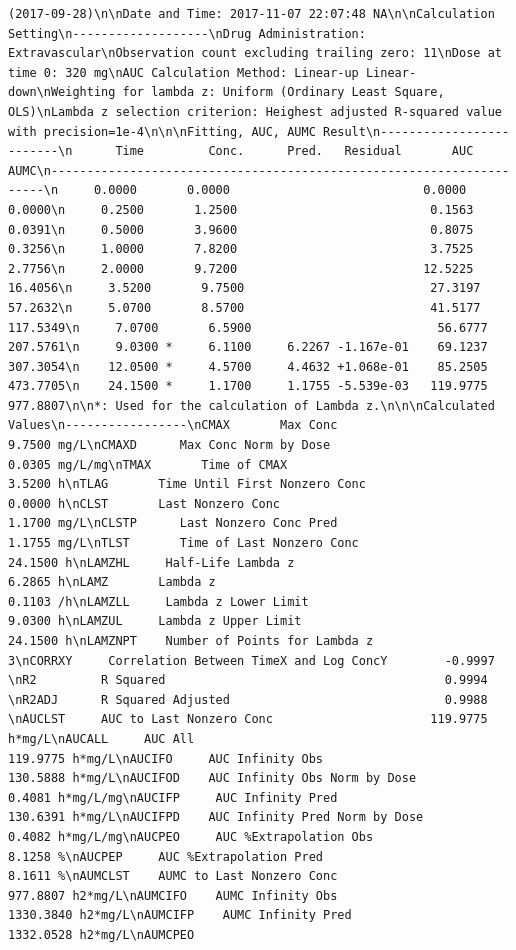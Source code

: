\documentclass[12pt,]{krantz}
\theoremstyle{definition}
\theoremstyle{definition}
\theoremstyle{definition}
\theoremstyle{remark}
\begin{document}
\begin{verbatim}
(2017-09-28)\n\nDate and Time: 2017-11-07 22:07:48 NA\n\nCalculation Setting\n-------------------\nDrug Administration: Extravascular\nObservation count excluding trailing zero: 11\nDose at time 0: 320 mg\nAUC Calculation Method: Linear-up Linear-down\nWeighting for lambda z: Uniform (Ordinary Least Square, OLS)\nLambda z selection criterion: Heighest adjusted R-squared value with precision=1e-4\n\n\nFitting, AUC, AUMC Result\n-------------------------\n      Time         Conc.      Pred.   Residual       AUC       AUMC\n---------------------------------------------------------------------\n     0.0000       0.0000                           0.0000     0.0000\n     0.2500       1.2500                           0.1563     0.0391\n     0.5000       3.9600                           0.8075     0.3256\n     1.0000       7.8200                           3.7525     2.7756\n     2.0000       9.7200                          12.5225    16.4056\n     3.5200       9.7500                          27.3197    57.2632\n     5.0700       8.5700                          41.5177   117.5349\n     7.0700       6.5900                          56.6777   207.5761\n     9.0300 *     6.1100     6.2267 -1.167e-01    69.1237   307.3054\n    12.0500 *     4.5700     4.4632 +1.068e-01    85.2505   473.7705\n    24.1500 *     1.1700     1.1755 -5.539e-03   119.9775   977.8807\n\n*: Used for the calculation of Lambda z.\n\n\nCalculated Values\n-----------------\nCMAX       Max Conc                                        9.7500 mg/L\nCMAXD      Max Conc Norm by Dose                           0.0305 mg/L/mg\nTMAX       Time of CMAX                                    3.5200 h\nTLAG       Time Until First Nonzero Conc                   0.0000 h\nCLST       Last Nonzero Conc                               1.1700 mg/L\nCLSTP      Last Nonzero Conc Pred                          1.1755 mg/L\nTLST       Time of Last Nonzero Conc                      24.1500 h\nLAMZHL     Half-Life Lambda z                              6.2865 h\nLAMZ       Lambda z                                        0.1103 /h\nLAMZLL     Lambda z Lower Limit                            9.0300 h\nLAMZUL     Lambda z Upper Limit                           24.1500 h\nLAMZNPT    Number of Points for Lambda z                   3\nCORRXY     Correlation Between TimeX and Log ConcY        -0.9997 \nR2         R Squared                                       0.9994 \nR2ADJ      R Squared Adjusted                              0.9988 \nAUCLST     AUC to Last Nonzero Conc                      119.9775 h*mg/L\nAUCALL     AUC All                                       119.9775 h*mg/L\nAUCIFO     AUC Infinity Obs                              130.5888 h*mg/L\nAUCIFOD    AUC Infinity Obs Norm by Dose                   0.4081 h*mg/L/mg\nAUCIFP     AUC Infinity Pred                             130.6391 h*mg/L\nAUCIFPD    AUC Infinity Pred Norm by Dose                  0.4082 h*mg/L/mg\nAUCPEO     AUC %Extrapolation Obs                          8.1258 %\nAUCPEP     AUC %Extrapolation Pred                         8.1611 %\nAUMCLST    AUMC to Last Nonzero Conc                     977.8807 h2*mg/L\nAUMCIFO    AUMC Infinity Obs                            1330.3840 h2*mg/L\nAUMCIFP    AUMC Infinity Pred                           1332.0528 h2*mg/L\nAUMCPEO    
\end{verbatim}
\end{document}
